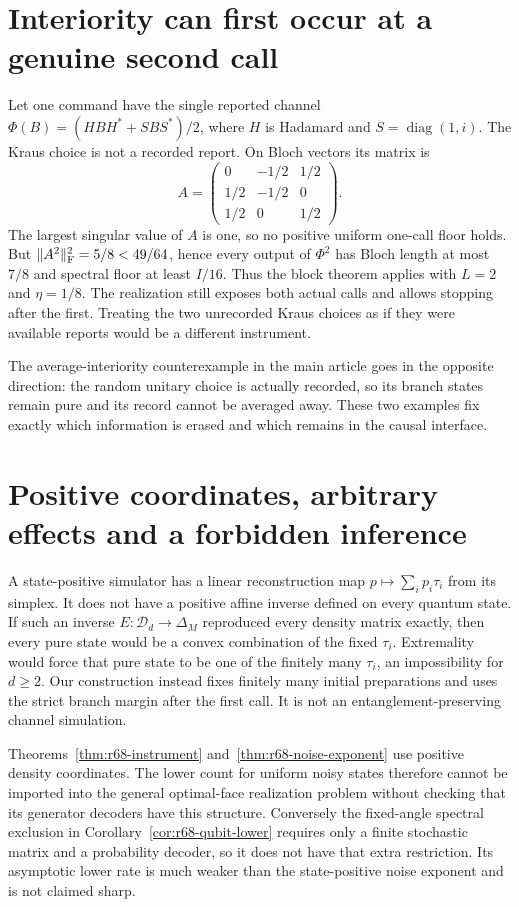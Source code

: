 \section{Interiority can first occur at a genuine second call}\label{sec:supp-block-interior}
Let one command have the single reported channel $\Phi(B)=(HBH^*+SBS^*)/2$, where $H$ is Hadamard and $S=\operatorname{diag}(1,i)$. The Kraus choice is not a recorded report. On Bloch vectors its matrix is
\[
 A=\begin{pmatrix}0&-1/2&1/2\\1/2&-1/2&0\\1/2&0&1/2\end{pmatrix}.
\]
The largest singular value of $A$ is one, so no positive uniform one-call floor holds. But $\|A^2\|_{\rm F}^2=5/8<49/64$, hence every output of $\Phi^2$ has Bloch length at most $7/8$ and spectral floor at least $I/16$. Thus the block theorem applies with $L=2$ and $\eta=1/8$. The realization still exposes both actual calls and allows stopping after the first. Treating the two unrecorded Kraus choices as if they were available reports would be a different instrument.

The average-interiority counterexample in the main article goes in the opposite direction: the random unitary choice is actually recorded, so its branch states remain pure and its record cannot be averaged away. These two examples fix exactly which information is erased and which remains in the causal interface.

\section{Positive coordinates, arbitrary effects and a forbidden inference}\label{sec:supp-positive-scope}
A state-positive simulator has a linear reconstruction map $p\mapsto\sum_ip_i\tau_i$ from its simplex. It does not have a positive affine inverse defined on every quantum state. If such an inverse $E:\mathcal D_d\to\Delta_M$ reproduced every density matrix exactly, then every pure state would be a convex combination of the fixed $\tau_i$. Extremality would force that pure state to be one of the finitely many $\tau_i$, an impossibility for $d\ge2$. Our construction instead fixes finitely many initial preparations and uses the strict branch margin after the first call. It is not an entanglement-preserving channel simulation.

Theorems~\ref{thm:r68-instrument} and~\ref{thm:r68-noise-exponent} use positive density coordinates. The lower count for uniform noisy states therefore cannot be imported into the general optimal-face realization problem without checking that its generator decoders have this structure. Conversely the fixed-angle spectral exclusion in Corollary~\ref{cor:r68-qubit-lower} requires only a finite stochastic matrix and a probability decoder, so it does not have that extra restriction. Its asymptotic lower rate is much weaker than the state-positive noise exponent and is not claimed sharp.


